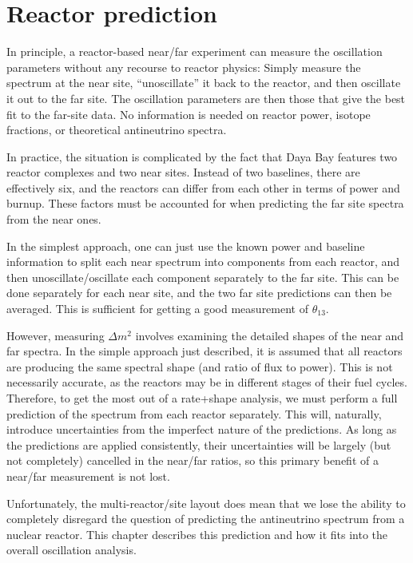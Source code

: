 \documentclass[../thesis.tex]{subfiles}
\begin{document}
\chapter{Reactor prediction}
\label{chap:bkg}

In principle, a reactor-based near/far experiment can measure the oscillation parameters without any recourse to reactor physics: Simply measure the spectrum at the near site, ``unoscillate'' it back to the reactor, and then oscillate it out to the far site. The oscillation parameters are then those that give the best fit to the far-site data. No information is needed on reactor power, isotope fractions, or theoretical antineutrino spectra.

In practice, the situation is complicated by the fact that Daya Bay features two reactor complexes and two near sites. Instead of two baselines, there are effectively six, and the reactors can differ from each other in terms of power and burnup. These factors must be accounted for when predicting the far site spectra from the near ones.

In the simplest approach, one can just use the known power and baseline information to split each near spectrum into components from each reactor, and then unoscillate/oscillate each component separately to the far site. This can be done separately for each near site, and the two far site predictions can then be averaged. This is sufficient for getting a good measurement of $\theta_{13}$.

However, measuring $\Delta m^2$ involves examining the detailed shapes of the near and far spectra. In the simple approach just described, it is assumed that all reactors are producing the same spectral shape (and ratio of flux to power). This is not necessarily accurate, as the reactors may be in different stages of their fuel cycles. Therefore, to get the most out of a rate+shape analysis, we must perform a full prediction of the spectrum from each reactor separately. This will, naturally, introduce uncertainties from the imperfect nature of the predictions. As long as the predictions are applied consistently, their uncertainties will be largely (but not completely) cancelled in the near/far ratios, so this primary benefit of a near/far measurement is not lost.

Unfortunately, the multi-reactor/site layout does mean that we lose the ability to completely disregard the question of predicting the antineutrino spectrum from a nuclear reactor. This chapter describes this prediction and how it fits into the overall oscillation analysis.
\end{document}
